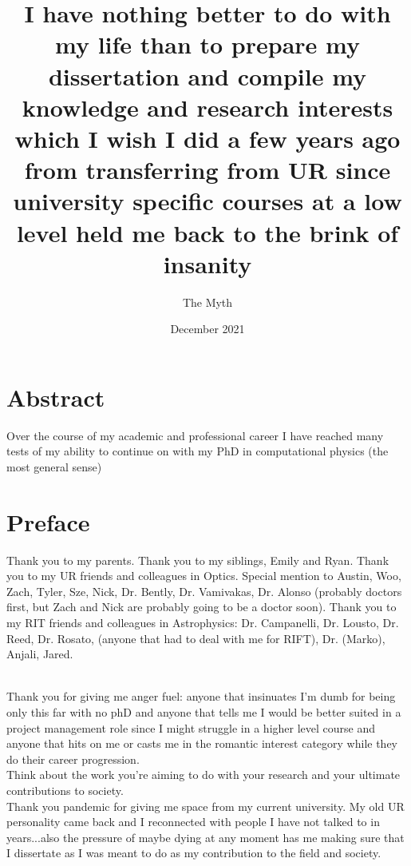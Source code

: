 \documentclass{dcthesis}
\title{I have nothing better to do with my life than to prepare my dissertation and compile my knowledge and research interests which I wish I did a few years ago from transferring from UR since university specific courses at a low level held me back to the brink of insanity}
\author{The Myth}
\date{December 2021}
\theoremstyle{definition}
\theoremstyle{remark}
\begin{document}
\frontmatter

\maketitle
\restoregeometry

\chapter*{Abstract}
Over the course of my academic and professional career I have reached many tests of my ability to continue on with my PhD in computational physics (the most general sense) 

\chapter*{Preface}
Thank you to my parents. Thank you to my siblings, Emily and Ryan. Thank you to my UR friends and colleagues in Optics. Special mention to Austin, Woo, Zach, Tyler, Sze, Nick, Dr. Bently, Dr. Vamivakas, Dr. Alonso (probably doctors first, but Zach and Nick are probably going to be a doctor soon). Thank you to my RIT friends and colleagues in Astrophysics: Dr. Campanelli, Dr. Lousto, Dr. Reed, Dr. Rosato, (anyone that had to deal with me for RIFT), Dr. (Marko), Anjali, Jared.

\\ 
Thank you for giving me anger fuel: anyone that insinuates I'm dumb for being only this far with no phD and anyone that tells me I would be better suited in a project management role since I might struggle in a higher level course and anyone that hits on me or casts me in the romantic interest category while they do their career progression. \\ 

Think about the work you're aiming to do with your research and your ultimate contributions to society. \\


Thank you pandemic for giving me space from my current university. My old UR personality came back and I reconnected with people I have not talked to in years...also the pressure of maybe dying at any moment has me making sure that I dissertate as I was meant to do as my contribution to the field and society.  \\
\end{document}
